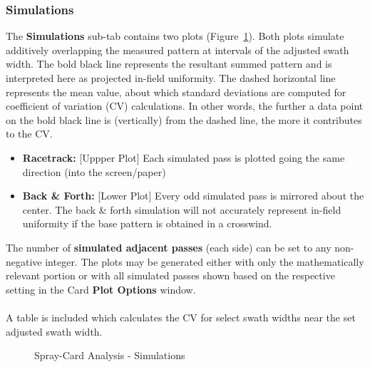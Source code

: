 \documentclass[10pt,letterpaper,titlepage]{article}
\begin{document}
    \subsubsection{Simulations}
    The \textbf{Simulations} sub-tab contains two plots (Figure~\ref{fig:card_simulations}). Both plots simulate additively overlapping the measured pattern at intervals of the adjusted swath width. The bold black line represents the resultant summed pattern and is interpreted here as projected in-field uniformity. The dashed horizontal line represents the mean value, about which standard deviations are computed for coefficient of variation (CV) calculations. In other words, the further a data point on the bold black line is (vertically) from the dashed line, the more it contributes to the CV.
    \begin{itemize}
        \item \textbf{Racetrack:} [Uppper Plot] Each simulated pass is plotted going the same direction (into the screen/paper)
        \item \textbf{Back \& Forth:} [Lower Plot] Every odd simulated pass is mirrored about the center. \color{red} The back \& forth simulation will not accurately represent in-field uniformity if the base pattern is obtained in a crosswind. \color{black}
    \end{itemize}
    The number of \textbf{simulated adjacent passes} (each side) can be set to any non-negative integer. The plots may be generated either with only the mathematically relevant portion or with all simulated passes shown based on the respective setting in the Card \textbf{Plot Options} window.
    \\\\
    A table is included which calculates the CV for select swath widths near the set adjusted swath width.

    \begin{figure}[hb]
        \centering
        \caption{Spray-Card Analysis - Simulations}
        \label{fig:card_simulations}
    \end{figure}
    \newpage
\end{document}
